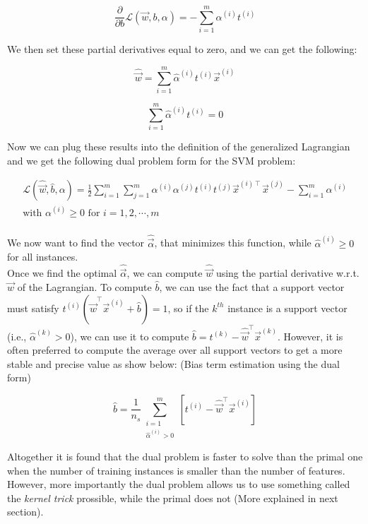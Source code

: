 $$\frac{\partial}{\partial b}\mathcal{L}(\vec{w}, b, \alpha) = -\sum_{i=1}^{m} \alpha^{(i)}t^{(i)}$$

\noindent
We then set these partial derivatives equal to zero, and we can get the following:

$$\hat{\vec{w}} = \sum_{i=1}^{m} \hat{\alpha}^{(i)} t^{(i)} \vec{x}^{(i)}$$

$$\sum_{i=1}^{m} \hat{\alpha}^{(i)} t^{(i)} = 0$$

\noindent
Now we can plug these results into the definition of the generalized Lagrangian and we get the following dual 
problem form for the SVM problem:

\[
\begin{aligned}
\mathcal{L}(\hat{\vec{w}}, \hat{b}, \alpha) = \frac{1}{2} \sum_{i=1}^{m} \sum_{j=1}^{m} \alpha^{(i)} \alpha^{(j)} t^{(i)} t^{(j)} \vec{x}^{(i)\intercal} \vec{x}^{(j)} - \sum_{i=1}^{m} \alpha^{(i)} \\
\textrm{with } \alpha^{(i)} \geq 0 \textrm{ for } i = 1, 2, \cdots, m
\end{aligned}
\] \\

\noindent
We now want to find the vector $\hat{\vec{\alpha}}$, that minimizes this function, while $\hat{\alpha}^{(i)} \geq 0$
for all instances. \\

\noindent
Once we find the optimal $\hat{\vec{\alpha}}$, we can compute $\hat{\vec{w}}$ using the partial derivative w.r.t. 
$\vec{w}$ of the Lagrangian. To compute $\hat{b}$, we can use the fact that a support vector must satisfy 
$t^{(i)}(\hat{\vec{w}}^{\intercal}\vec{x}^{(i)}+\hat{b}) = 1$, so if the $k^{th}$ instance is a support vector
(i.e., $\hat{\alpha}^{(k)} > 0$), we can use it to compute $\hat{b} = t^{(k)} - \hat{\vec{w}}^{\intercal}\vec{x}^{(k)}$.
However, it is often preferred to compute the average over all support vectors to get a more stable and 
precise value as show below: (Bias term estimation using the dual form)

$$\hat{b} = \frac{1}{n_{s}} \sum_{\substack{i = 1 \\ \hat{\alpha}^{(i)}>0}}^{m} [t^{(i)} - \hat{\vec{w}}^{\intercal}\vec{x}^{(i)}]$$

\noindent
Altogether it is found that the dual problem is faster to solve than the primal one when the number of training
instances is smaller than the number of features. However, more importantly the dual problem allows us to use 
something called the \textit{kernel trick} prossible, while the primal does not (More explained in next section).

